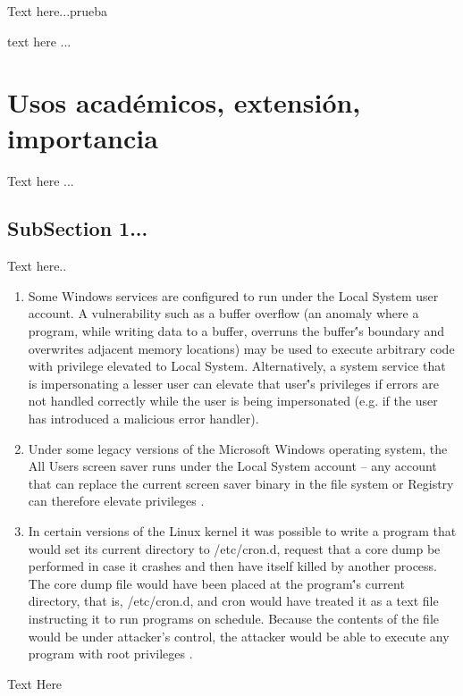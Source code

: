 \documentclass[letterpaper, 10pt, journal]{IEEEtran}
\begin{document}
Text here...prueba

\begin{enumerate}{
    \item Interactive computing (time-sharing)
    \item Hierarchical file systems
    \item Fault tolerant structures
    \item Interrupt systems
    \item Automated overlays (virtual memory)
    \item Multiprogramming
    \item Modular programming
    \item Controlled information sharing
    \item Users
\end{enumerate}

text here ...

\section{Usos acad\'emicos, extensi\'on, importancia}
Text here ...

\subsection{SubSection 1...}
Text here..
\begin{enumerate}
\item	Some Windows services are configured to run under the Local System user account. A vulnerability such as a buffer overflow (an anomaly where a program, while writing data to a buffer, overruns the buffer\''s boundary and overwrites adjacent memory locations) may be used to execute arbitrary code with privilege elevated to Local System. Alternatively, a system service that is impersonating a lesser user can elevate that user\''s privileges if errors are not handled correctly while the user is being impersonated (e.g. if the user has introduced a malicious error handler)\cite{[6]}.
\item	Under some legacy versions of the Microsoft Windows operating system, the All Users screen saver runs under the Local System account – any account that can replace the current screen saver binary in the file system or Registry can therefore elevate privileges \cite{[6]}.
\item	In certain versions of the Linux kernel it was possible to write a program that would set its current directory to /etc/cron.d, request that a core dump be performed in case it crashes and then have itself killed by another process. The core dump file would have been placed at the program\''s current directory, that is, /etc/cron.d, and cron would have treated it as a text file instructing it to run programs on schedule. Because the contents of the file would be under attacker’s control, the attacker would be able to execute any program with root privileges \cite{[3]}.
\end{enumerate}
Text Here
\end{document}
